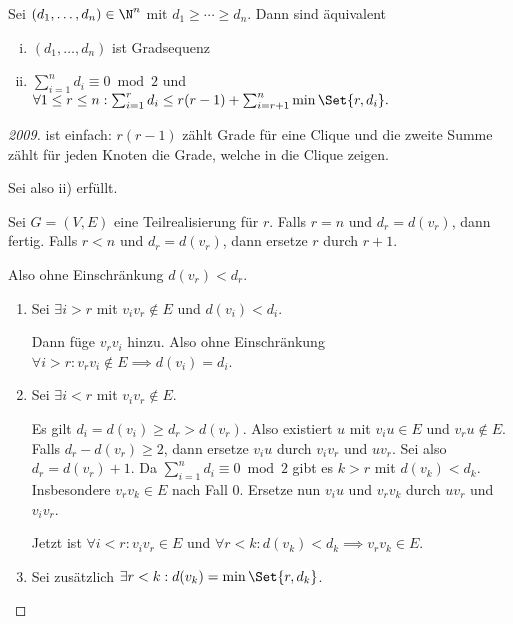 \begin{st}
    Sei $(d_1, \dotsc, d_n) \in \N^n$ mit $d_1 \ge \dotsb \ge d_n$.
    Dann sind äquivalent
    \begin{enumerate}[i)]
        \item
            $(d_1, \dotsc, d_n)$ ist Gradsequenz
        \item
            $\sum_{i=1}^n d_i \equiv 0 \bmod 2$ und
            \begin{math}
                \forall 1 \le r \le n : \sum_{i=1}^r d_i \le r(r-1) + \sum_{i=r+1}^n \min\Set{r, d_i}.
            \end{math}
    \end{enumerate}
    \begin{proof}[2009]
        \ProofImplication ist einfach: $r(r-1)$ zählt Grade für eine Clique und die zweite Summe zählt für jeden Knoten die Grade, welche in die Clique zeigen.

        Sei also ii) erfüllt.

        Sei $G = (V, E)$ eine Teilrealisierung für $r$.
        Falls $r = n$ und $d_r = d(v_r)$, dann fertig.
        Falls $r < n$ und $d_r = d(v_r)$, dann ersetze $r$ durch $r + 1$.

        Also ohne Einschränkung $d(v_r) < d_r$.
        \begin{enumerate}[1), start=0]
            \item
                Sei $\exists i > r$ mit $v_i v_r \not\in E$ und $d(v_i) < d_i$.

                Dann füge $v_r v_i$ hinzu.
                Also ohne Einschränkung $\forall i > r: v_r v_i \not\in E \implies d(v_i) = d_i$.
            \item
                Sei $\exists i < r$ mit $v_i v_r \not\in E$.

                Es gilt $d_i = d(v_i) \ge d_r > d(v_r)$.
                Also existiert $u$ mit $v_i u \in E$ und $v_r u \not\in E$.
                Falls $d_r - d(v_r) \ge 2$, dann ersetze $v_i u$ durch $v_i v_r$ und $uv_r$.
                Sei also $d_r = d(v_r) + 1$.
                Da $\sum_{i=1}^n d_i \equiv 0 \bmod 2$ gibt es $k > r$ mit $d(v_k) < d_k$.
                Insbesondere $v_r v_k \in E$ nach Fall 0.
                Ersetze nun $v_i u$ und $v_r v_k$ durch $u v_r$ und $v_i v_r$.

                Jetzt ist $\forall i < r: v_i v_r \in E$ und $\forall r < k: d(v_k) < d_k \implies v_r v_k \in E$.
            \item
                Sei zusätzlich $\exists r < k: d(v_k) = \min\Set{r, d_k}$.
        \end{enumerate}
    \end{proof}
\end{st}



